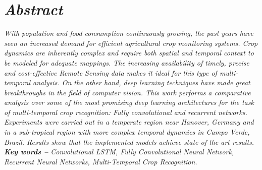 
 
\section*{\textit {Abstract}} %


\hspace{-1.5mm}\textit{ %
With population and food consumption continuously growing, the past years have seen an increased demand for efficient agricultural crop monitoring systems. Crop dynamics are inherently complex and require both spatial and temporal context to be modeled for adequate mappings. The increasing availability of timely, precise and cost-effective Remote Sensing data makes it ideal for this type of multi-temporal analysis. On the other hand, deep learning techniques have made great breakthroughs in the field of computer vision. This work performs a comparative analysis over some of the most promising deep learning architectures for the task of multi-temporal crop recognition: Fully convolutional and recurrent networks. Experiments were carried out in a temperate region near Hanover, Germany and in a sub-tropical region with more complex temporal dynamics in Campo Verde, Brazil. Results show that the implemented models achieve state-of-the-art results.
}
\\
\textit{\textbf{Key words --} %
Convolutional LSTM, Fully Convolutional Neural Network, Recurrent Neural Networks, Multi-Temporal Crop Recognition. %
}